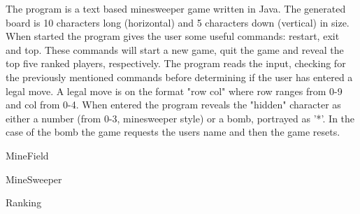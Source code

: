 The program is a text based minesweeper game written in Java. The generated board is 10 characters long (horizontal) and 5 characters down (vertical) in size. When started the program gives the user some useful commands: restart, exit and top. These commands will start a new game, quit the game and reveal the top five ranked players, respectively. The program reads the input, checking for the previously mentioned commands before determining if the user has entered a legal move. A legal move is on the format "row col" where row ranges from 0-9 and col from 0-4. When entered the program reveals the "hidden" character as either a number (from 0-3, minesweeper style) or a bomb, portrayed as '*'. In the case of the bomb the game requests the users name and then the game resets.

MineField

MineSweeper

Ranking








